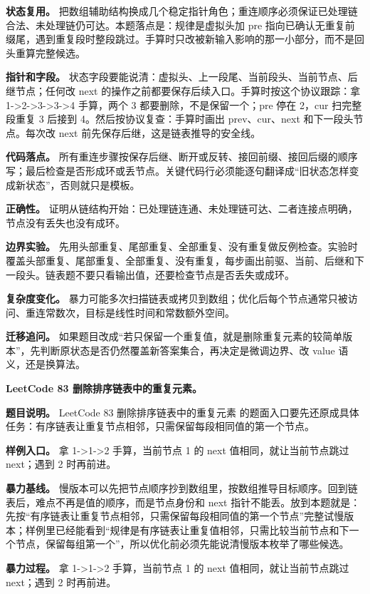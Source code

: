 \textbf{状态复用。} 把数组辅助结构换成几个稳定指针角色；重连顺序必须保证已处理链合法、未处理链仍可达。本题落点是：规律是虚拟头加 pre 指向已确认无重复前缀尾，遇到重复段时整段跳过。手算时只改被新输入影响的那一小部分，而不是回头重算完整候选。

\textbf{指针和字段。} 状态字段要能说清：虚拟头、上一段尾、当前段头、当前节点、后继节点；任何改 next 的操作之前都要保存后续入口。手算时按这个协议跟踪：拿 1->2->3->3->4 手算，两个 3 都要删除，不是保留一个；pre 停在 2，cur 扫完整段重复 3 后接到 4。然后按协议复查：手算时画出 prev、cur、next 和下一段头节点。每次改 next 前先保存后继，这是链表推导的安全线。

\textbf{代码落点。} 所有重连步骤按保存后继、断开或反转、接回前缀、接回后缀的顺序写；最后检查是否形成环或丢节点。关键代码行必须能逐句翻译成“旧状态怎样变成新状态”，否则就只是模板。

\textbf{正确性。} 证明从链结构开始：已处理链连通、未处理链可达、二者连接点明确，节点没有丢失也没有成环。

\textbf{边界实验。} 先用头部重复、尾部重复、全部重复、没有重复做反例检查。实验时覆盖头部重复、尾部重复、全部重复、没有重复，每步画出前驱、当前、后继和下一段头。链表题不要只看输出值，还要检查节点是否丢失或成环。

\textbf{复杂度变化。} 暴力可能多次扫描链表或拷贝到数组；优化后每个节点通常只被访问、重连常数次，目标是线性时间和常数额外空间。

\textbf{迁移追问。} 如果题目改成“若只保留一个重复值，就是删除重复元素的较简单版本”，先判断原状态是否仍然覆盖新答案集合，再决定是微调边界、改 value 语义，还是换算法。

\noindent\textbf{LeetCode 83 删除排序链表中的重复元素。}

\textbf{题目说明。} LeetCode 83 删除排序链表中的重复元素 的题面入口要先还原成具体任务：有序链表让重复节点相邻，只需保留每段相同值的第一个节点。

\textbf{样例入口。} 拿 1->1->2 手算，当前节点 1 的 next 值相同，就让当前节点跳过 next；遇到 2 时再前进。

\textbf{暴力基线。} 慢版本可以先把节点顺序抄到数组里，按数组推导目标顺序。回到链表后，难点不再是值的顺序，而是节点身份和 next 指针不能丢。放到本题就是：先按“有序链表让重复节点相邻，只需保留每段相同值的第一个节点”完整试慢版本；样例里已经能看到“规律是有序链表让重复值相邻，只需比较当前节点和下一个节点，保留每组第一个”，所以优化前必须先能说清慢版本枚举了哪些候选。

\textbf{暴力过程。} 拿 1->1->2 手算，当前节点 1 的 next 值相同，就让当前节点跳过 next；遇到 2 时再前进。

